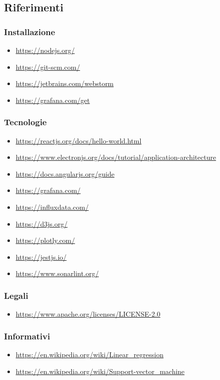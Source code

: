 \subsection{Riferimenti}
\subsubsection{Installazione}
\begin{itemize}
	\item \url{https://nodejs.org/}
	\item \url{https://git-scm.com/}
	\item \url{https://jetbrains.com/webstorm}
	\item \url{https://grafana.com/get}
\end{itemize}
\subsubsection{Tecnologie}
\begin{itemize}
	\item \url{https://reactjs.org/docs/hello-world.html}
	\item \url{https://www.electronjs.org/docs/tutorial/application-architecture}
	\item \url{https://docs.angularjs.org/guide}
	\item \url{https://grafana.com/}
	\item \url{https://influxdata.com/}
	\item \url{https://d3js.org/}
	\item \url{https://plotly.com/}
	\item \url{https://jestjs.io/}
	\item \url{https://www.sonarlint.org/}
\end{itemize}
\subsubsection{Legali}
\begin{itemize}
	\item \url{https://www.apache.org/licenses/LICENSE-2.0}
\end{itemize}
\subsubsection{Informativi}
\begin{itemize}
	\item \url{https://en.wikipedia.org/wiki/Linear_regression}
	\item \url{https://en.wikipedia.org/wiki/Support-vector_machine}
\end{itemize}
